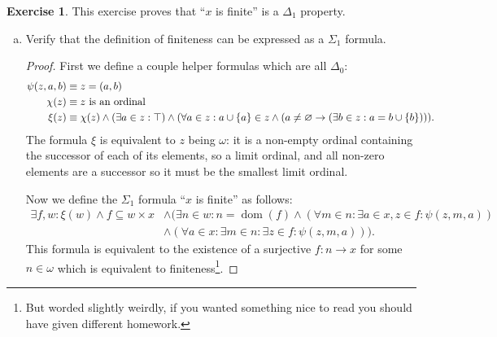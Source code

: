 \documentclass{article}
\theoremstyle{definition}
\newtheorem{question}{Exercise}
\newcommand{\set}[1]{\left\{#1\right\}}
\DeclareMathOperator{\dom}{dom}
\begin{document}
\begin{question}
    This exercise proves that ``\(x\) is finite'' is a \(\Delta_{1}\) property.

    \begin{enumerate}[a.]
        \item Verify that the definition of finiteness can be expressed as a
              \(\Sigma_{1}\) formula.

              \begin{proof}
                  First we define a couple helper formulas which are all
                  \(\Delta_{0}\):
                  \begin{align*}
                      \psi(z,a,b) & \equiv z=(a,b)                                                                                                                               \\
                      \chi(z)     & \equiv\textnormal{\(z\) is an ordinal}                                                                                                       \\
                      \xi(z)      & \equiv\chi(z)\wedge(\exists a\in z:\top)\wedge(\forall a\in z:a\cup\set{a}\in z\wedge (a\neq\varnothing\to(\exists b\in z:a=b\cup\set{b}))).
                  \end{align*}
                  The formula \(\xi\) is equivalent to \(z\) being \(\omega\):
                  it is a non-empty ordinal containing the successor of each of
                  its elements, so a limit ordinal, and all non-zero elements
                  are a successor so it must be the smallest limit ordinal.

                  Now we define the \(\Sigma_{1}\) formula ``\(x\) is finite''
                  as follows:
                  \begin{align*}
                      \exists f,w:\xi(w)\wedge f\subseteq w\times x
                       & \wedge(\exists n\in w:n=\dom(f) \wedge (\forall m\in n:\exists a\in x,z\in f:\psi(z,m,a)) \\
                       & \wedge(\forall a\in x:\exists m\in n:\exists z\in f:\psi(z,m,a))).
                  \end{align*}
                  This formula is equivalent to the existence of a surjective
                  \(f:n\to x\) for some \(n\in \omega\) which is equivalent to
                  finiteness\footnote{But worded slightly weirdly, if you wanted
                      something nice to read you should have given different
                      homework.}.


\end{proof}
\end{enumerate}
\end{question}
\end{document}
